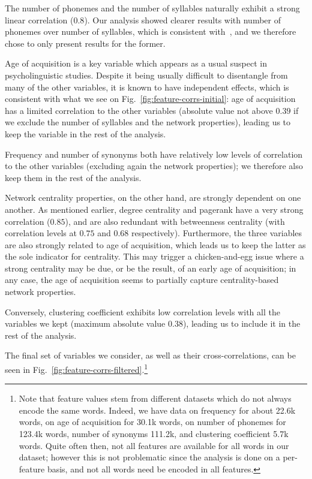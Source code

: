 The number of phonemes and the number of syllables naturally exhibit a strong linear correlation ($0.8$).
Our analysis showed clearer results with number of phonemes over number of syllables, which is consistent with~\citet{nick-diss}, and we therefore chose to only present results for the former.

Age of acquisition is a key variable which appears as a usual suspect in psycholinguistic studies.
Despite it being usually difficult to disentangle from many of the other variables, it is known to have independent effects, which is consistent with what we see on Fig.~\ref{fig:feature-corrs-initial}: age of acquisition has a limited correlation to the other variables (absolute value not above $0.39$ if we exclude the number of syllables and the network properties), leading us to keep the variable in the rest of the analysis.

Frequency and number of synonyms both have relatively low levels of correlation to the other variables (excluding again the network properties); we therefore also keep them in the rest of the analysis.

\bigskip
Network centrality properties, on the other hand, are strongly dependent on one another.
As mentioned earlier, degree centrality and pagerank have a very strong correlation ($0.85$), and are also redundant with betweenness centrality (with correlation levels at $0.75$ and $0.68$ respectively).
Furthermore, the three variables are also strongly related to age of acquisition, which leads us to keep the latter as the sole indicator for centrality. This may trigger a chicken-and-egg issue where a strong centrality may be due, or be the result, of an early age of acquisition; in any case, the age of acquisition seems to partially capture centrality-based network properties.

Conversely, clustering coefficient exhibits low correlation levels with all the variables we kept (maximum absolute value $0.38$), leading us to include it in the rest of the analysis.

The final set of variables we consider, as well as their cross-correlations, can be seen in Fig.~\ref{fig:feature-corrs-filtered}.\footnote{Note that feature values stem from different datasets which do not always encode the same words.
Indeed, we have data on frequency for about 22.6k words, on age of acquisition for 30.1k words, on number of phonemes for 123.4k words, number of synonyms 111.2k, and clustering coefficient 5.7k words.
Quite often then, not all features are available for all words in our dataset; %
however this is not problematic since the analysis is done on a per-feature basis, and not all words need be encoded in all features.}

